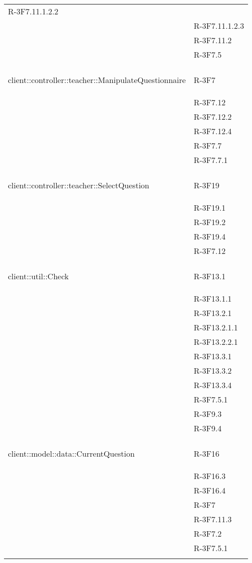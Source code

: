 \begin{longtable}{l p{3cm}}
	R-3F7.11.1.2.2 \tabularnewline &
	
	R-3F7.11.1.2.3 \tabularnewline &
	
	R-3F7.11.2 \tabularnewline &
	
	R-3F7.5 \tabularnewline &\tabularnewline
	\hline
	\hypertarget{client::controller::teacher::ManipulateQuestionnaire}{client::controller::teacher::ManipulateQuestionnaire} & R-3F7 \tabularnewline &
	
	R-3F7.12 \tabularnewline &
	
	R-3F7.12.2 \tabularnewline &
	
	R-3F7.12.4 \tabularnewline &
	
	R-3F7.7 \tabularnewline &
	
	R-3F7.7.1 \tabularnewline &\tabularnewline
	\hline
	\hypertarget{client::controller::teacher::SelectQuestion}{client::controller::teacher::SelectQuestion} & R-3F19 \tabularnewline &
	
	R-3F19.1 \tabularnewline &
	
	R-3F19.2 \tabularnewline &
	
	R-3F19.4 \tabularnewline &
	
	R-3F7.12 \tabularnewline &\tabularnewline
	\hline
	\hypertarget{client::util::Check}{client::util::Check} & R-3F13.1 \tabularnewline &
	
	R-3F13.1.1 \tabularnewline &
	
	R-3F13.2.1 \tabularnewline &
	
	R-3F13.2.1.1 \tabularnewline &
	
	R-3F13.2.2.1 \tabularnewline &
	
	R-3F13.3.1 \tabularnewline &
	
	R-3F13.3.2 \tabularnewline &
	
	R-3F13.3.4 \tabularnewline &
	
	R-3F7.5.1 \tabularnewline &
	
	R-3F9.3 \tabularnewline &
	
	R-3F9.4 \tabularnewline &\tabularnewline
	\hline
	\hypertarget{client::model::data::CurrentQuestion}{client::model::data::CurrentQuestion} & R-3F16 \tabularnewline &
	
	R-3F16.3 \tabularnewline &
	
	R-3F16.4 \tabularnewline &
	
	R-3F7 \tabularnewline &
	
	R-3F7.11.3 \tabularnewline &
	
	R-3F7.2 \tabularnewline &
	
	R-3F7.5.1 \tabularnewline &
	

\end{longtable}
